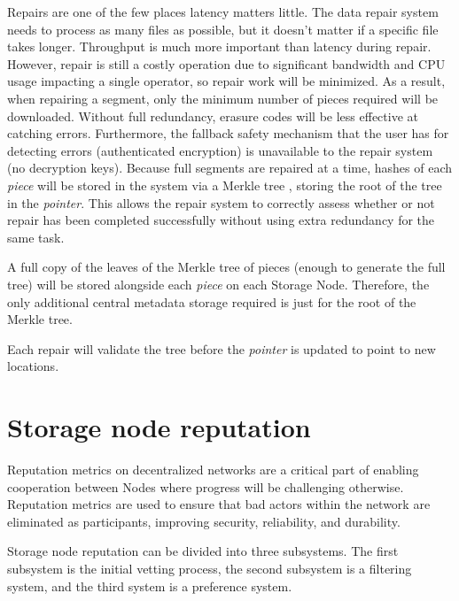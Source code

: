 \documentclass[8pt,fleqn,openany]{book}
\begin{document}
Repairs are one of the few places latency matters little. The data repair system
needs to process as many files as possible, but it doesn't matter if
a specific file takes longer. Throughput is much more important than
latency during repair. However, repair
is still a costly operation due to significant bandwidth and CPU usage
impacting a single operator, so repair work will be minimized.
As a result, when repairing a segment,
only the minimum number of pieces required will be downloaded.
Without full redundancy, erasure codes will be less effective at catching
errors. Furthermore, the fallback safety mechanism that the user has for detecting
errors (authenticated encryption) is unavailable to the repair system (no
decryption keys).
Because full segments are repaired at a time, hashes of
each {\em piece} will be stored in the system via a Merkle tree
\cite{merkle-tree}, storing the root of the tree in the {\em pointer}. This allows
the repair system to correctly assess whether or not repair has been completed
successfully without using extra redundancy for the same task.

A full copy of the leaves of the Merkle tree of pieces (enough to generate
the full tree) will be stored alongside each {\em piece} on each Storage Node.
Therefore, the only additional central metadata storage required is just for
the root of the Merkle tree.

Each repair will validate the tree before the {\em pointer} is updated to
point to new locations.

\section{Storage node reputation}\label{sec:concrete-reputation}

Reputation metrics on decentralized networks are a critical part of
enabling cooperation
between Nodes
where progress will be challenging otherwise. Reputation metrics
are used to ensure that bad actors
within the network are eliminated as participants, improving security,
reliability, and durability.

Storage node reputation can be divided into three subsystems. The first
subsystem is the initial vetting process, the second subsystem is a filtering
system, and the third system is a preference system.
\end{document}
